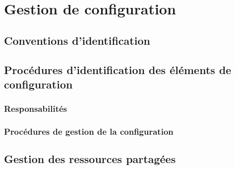 \section{Gestion de configuration}

\subsection{Conventions d'identification}

\subsection{Procédures d'identification des éléments de configuration}

\subsubsection{Responsabilités}

\subsubsection{Procédures de gestion de la configuration}

\subsection{Gestion des ressources partagées}
\pagebreak
